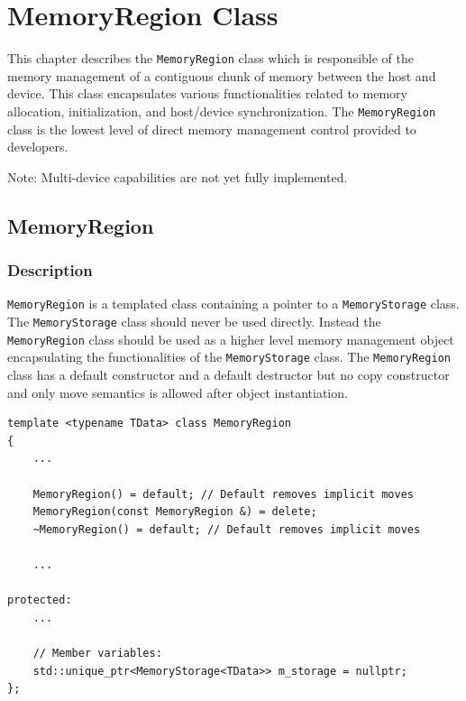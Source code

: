 \chapter{MemoryRegion Class}
This chapter describes the \lstinline[style=C++Style]!MemoryRegion!
class which is responsible of the memory management of a contiguous
chunk of memory between the host and device. This class encapsulates
various functionalities related to memory allocation, initialization,
and host/device synchronization. The
\lstinline[style=C++Style]!MemoryRegion! class is the lowest level of
direct memory management control provided to developers.

Note: Multi-device capabilities are not yet fully implemented.

\section{MemoryRegion}
\subsection{Description}
\lstinline[style=C++Style]!MemoryRegion! is a templated class
containing a pointer to a \lstinline[style=C++Style]!MemoryStorage!
class. The \lstinline[style=C++Style]!MemoryStorage! class should 
never be used directly. Instead the
\lstinline[style=C++Style]!MemoryRegion! class should be used as a
higher level memory management object encapsulating the
functionalities of the
\lstinline[style=C++Style]!MemoryStorage! class. The
\lstinline[style=C++Style]!MemoryRegion! class has a default
constructor and a default destructor but no copy constructor and only
move semantics is allowed after object instantiation.

\begin{lstlisting}[style=C++Style]
template <typename TData> class MemoryRegion
{
    ...

    MemoryRegion() = default; // Default removes implicit moves
    MemoryRegion(const MemoryRegion &) = delete;
    ~MemoryRegion() = default; // Default removes implicit moves

    ...

protected:
    ...

    // Member variables:
    std::unique_ptr<MemoryStorage<TData>> m_storage = nullptr;
};
\end{lstlisting}

